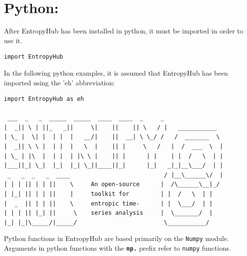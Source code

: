 \documentclass[12pt, a4paper, titlepage, openany]{book}
\begin{document}
\newpage
\section{Python:}
\noindent After EntropyHub has been installed in python, it must be imported in order to use it.
\begin{verbatim}
import EntropyHub
\end{verbatim}
\noindent In the following python examples, it is assumed that EntropyHub has been imported using the 'eh' abbreviation:
\begin{verbatim}
import EntropyHub as eh

 ___  _   _  _____  _____  ____  ____  _     _          
|  _|| \ | ||_   _||     \|    ||    || \   / |   ___________ 
| \_ |  \| |  | |  |   __/|    ||  __| \ \_/ /   /  _______  \
|  _|| \ \ |  | |  |   \  |    || |     \   /   |  /  ___  \  |
| \_ | |\  |  | |  | |\ \ |    || |      | |    | |  /   \  | | 
|___||_| \_|  |_|  |_| \_||____||_|      |_|   _|_|__\___/  | | 
 _   _  _   _  ____                           / |__\______\/  | 
| | | || | | ||    \     An open-source      |  /\______\__|_/ 
| |_| || | | ||    |     toolkit for         | |  /   \  | | 
|  _  || | | ||    \     entropic time-      | |  \___/  | |          
| | | || |_| ||     \    series analysis     |  \_______/  |
|_| |_|\_____/|_____/                         \___________/ 

\end{verbatim}


\begin{tcolorbox}[sharp corners, colback=ehone!30, colframe=ehone, title=\textbf{NOTE}]
Python functions in EntropyHub are based primarily on the \texttt{Numpy} module.\\ Arguments in python functions with the \textbf{\texttt{np.}} prefix refer to \texttt{numpy} functions.  
\end{tcolorbox}


\newpage
\end{document}
